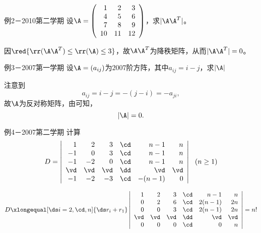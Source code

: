 \begin{frame}
  \begin{footnotesize}
    \begin{exampleblock}{例2－2010第二学期}
      设$\A=\left(
      \begin{array}{rrr}
        1&2&3\\
        4&5&6\\
        7&8&9\\
        10&11&12
      \end{array}
      \right)$，求$|\A\A^T|$。
    \end{exampleblock}
    \pause\jiename
    因$\red{\rr(\A\A^T)\le \rr(\A)\le 3}$，故$\A\A^T$为降秩矩阵，从而$|\A\A^T|=0$。
  \end{footnotesize}
\end{frame}


\begin{frame}
  \begin{footnotesize}
    \begin{exampleblock}{例3－2007第一学期}
      设$\A=(a_{ij})$为$2007$阶方阵，其中$a_{ij}=i-j$，求$|\A|$
    \end{exampleblock}
    \pause\jiename
    注意到
    $$
    a_{ij}=i-j=-(j-i)=-a_{ji},
    $$
    故$\A$为反对称矩阵，由可知，$$|\A|=0.$$
  \end{footnotesize}
\end{frame}



\begin{frame}
  \begin{footnotesize}
    \begin{exampleblock}{例4－2007第二学期}
      计算
      $$
      D=\left|
      \begin{array}{rrrrrr}
        1&2&3&\cd&n-1&n\\
        -1&0&3&\cd&n-1&n\\
        -1&-2&0&\cd&n-1&n\\
        \vd&\vd&\vd&\dd&\vd&\vd\\
        -1&-2&-3&\cd&-(n-1)&0
      \end{array}
      \right|~~(n\ge 1)
      $$
    \end{exampleblock}
    \pause \jiename
    $$
    D\xlongequal[\ds i=2,\cd,n]{\ds r_i+r_1}\left|
      \begin{array}{rrrrrr}
        1&2&3&\cd&n-1&n\\
        0&2&6&\cd&2(n-1)&2n\\
        0&0&3&\cd&2(n-1)&2n\\
        \vd&\vd&\vd&\dd&\vd&\vd\\
        0&0&0&\cd&0&n
      \end{array}
      \right|=n!
    $$
  \end{footnotesize}
\end{frame}

